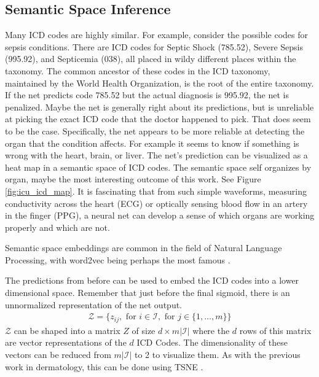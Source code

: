 \subsection{Semantic Space Inference}

Many ICD codes are highly similar.  For example, consider the possible codes for sepsis conditions.  There are ICD codes for Septic Shock (785.52), Severe Sepsis (995.92), and Septicemia (038), all placed in wildy different places within the taxonomy.  The common ancestor of these codes in the ICD taxonomy, maintained by the World Health Organization, is the root of the entire taxonomy.  If the net predicts code 785.52 but the actual diagnosis is 995.92, the net is penalized.  Maybe the net is generally right about its predictions, but is unreliable at picking the exact ICD code that the doctor happened to pick.  That does seem to be the case.  Specifically, the net appears to be more reliable at detecting the organ that the condition affects.  For example it seems to know if something is wrong with the heart, brain, or liver.  The net's prediction can be visualized as a heat map in a semantic space of ICD codes.  The semantic space self organizes by organ, maybe the most interesting outcome of this work.  See Figure \ref{fig:icu_icd_map}.  It is fascinating that from such simple waveforms, measuring conductivity across the heart (ECG) or optically sensing blood flow in an artery in the finger (PPG), a neural net can develop a sense of which organs are working properly and which are not.

Semantic space embeddings are common in the field of Natural Language Processing, with word2vec being perhaps the most famous \cite{mikolov2013efficient}.

The predictions from before can be used to embed the ICD codes into a lower dimensional space. Remember that just before the final sigmoid, there is an unnormalized representation of the net output.
\begin{gather}
    \mathcal{Z} = \{
        z_{ij},
        \text{ for } i \in \mathcal{I},
        \text{ for } j \in \{ 1, \dots, m \}
    \}
\end{gather}
$\mathcal{Z}$ can be shaped into a matrix $Z$ of size $d \times m |\mathcal{I}|$ where the $d$ rows of this matrix are vector representations of the $d$ ICD Codes.  The dimensionality of these vectors can be reduced from $m |\mathcal{I}|$ to 2 to visualize them.  As with the previous work in dermatology, this can be done using TSNE \cite{van2008visualizing}.

